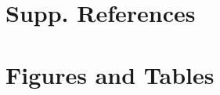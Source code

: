 \documentclass[11pt]{article} %
\begin{document}


\section{Supp. References}


\section{Figures and Tables}
\end{document}
